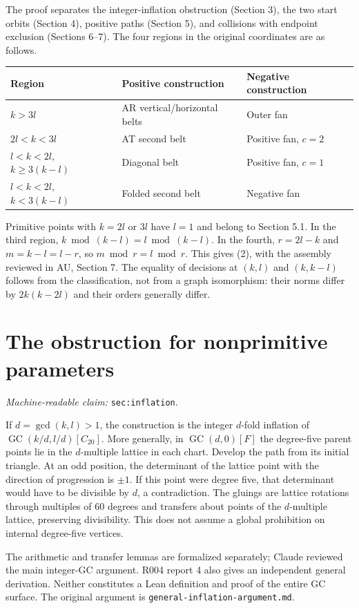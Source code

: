 \documentclass[11pt]{amsart}
\newcommand{\GC}{\operatorname{GC}}
\newcommand{\record}[1]{\nolinkurl{#1}}
\newcommand{\claimid}[1]{\par\nopagebreak\noindent\textit{Machine-readable claim:} \record{#1}.\par}
\begin{document}
The proof separates the integer-inflation obstruction (Section 3),
the two start orbits (Section 4), positive paths (Section 5), and
collisions with endpoint exclusion (Sections 6--7). The four regions
in the original coordinates are as follows.
\begin{center}\small
\begin{tabular}{lll}\toprule
Region & Positive construction & Negative construction\\\midrule
$k>3l$ & AR vertical/horizontal belts & Outer fan\\
$2l<k<3l$ & AT second belt & Positive fan, $c=2$\\
$l<k<2l$, $k\ge3(k-l)$ & Diagonal belt & Positive fan, $c=1$\\
$l<k<2l$, $k<3(k-l)$ & Folded second belt & Negative fan\\\bottomrule
\end{tabular}\end{center}
Primitive points with $k=2l$ or $3l$ have $l=1$ and belong to
Section 5.1. In the third region, $k\bmod(k-l)=l\bmod(k-l)$.
In the fourth, $r=2l-k$ and $m=k-l=l-r$, so $m\bmod r=l\bmod r$.
This gives (2), with the assembly reviewed in AU, Section 7.
The equality of decisions at $(k,l)$ and $(k,k-l)$ follows from the
classification, not from a graph isomorphism: their norms differ by
$2k(k-2l)$ and their orders generally differ.

\section{The obstruction for nonprimitive parameters}\label{sec:inflation}
\claimid{sec:inflation}
If $d=\gcd(k,l)>1$, the construction is the integer $d$-fold inflation
of $\GC(k/d,l/d)[C_{20}]$. More generally, in $\GC(d,0)[F]$ the
degree-five parent points lie in the $d$-multiple lattice in each chart.
Develop the path from its initial triangle. At an odd position, the
determinant of the lattice point with the direction of progression is
$\pm1$. If this point were degree five, that determinant would have to
be divisible by $d$, a contradiction. The gluings are lattice rotations
through multiples of $60$ degrees and transfers about points of the
$d$-multiple lattice, preserving divisibility. This does not assume a
global prohibition on internal degree-five vertices.

The arithmetic and transfer lemmas are formalized separately; Claude
reviewed the main integer-GC argument. R004 report 4 also gives an
independent general derivation. Neither constitutes a Lean definition
and proof of the entire GC surface. The original argument is
\record{general-inflation-argument.md}.
\end{document}
